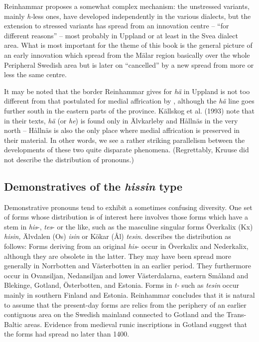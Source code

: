\begin{styleBodytextC}
 Reinhammar proposes a somewhat complex mechanism: the unstressed variants, mainly \textit{h-}less ones, have developed independently in the various dialects, but the extension to stressed variants has spread from an innovation centre – “for different reasons” –  most probably in Uppland or at least in the Svea dialect area. What is most important for the theme of this book is the general picture of an early innovation which spread from the Mälar region basically over the whole Peripheral Swedish area but is later on “cancelled” by a new spread from more or less the same centre. 

\end{styleBodytextC}

\begin{styleBodytextC}
It may be noted that the border Reinhammar gives for \textit{hä} in Uppland is not too different from that postulated for medial affrication by \citet{Kruuse1908}, although the \textit{hä} line goes further south in the eastern parts of the province. Källskog et al. (1993) note that in their texts, \textit{hä} (or \textit{he}) is found only in Älvkarleby and Hållnäs in the very north – Hållnäs is also the only place where medial affrication is preserved in their material. In other words, we see a rather striking parallelism between the developments of these two quite disparate phenomena. (Regrettably, Kruuse did not describe the distribution of pronouns.)

\end{styleBodytextC}

\subsection{Demonstratives of the \textit{hissin} type}

\begin{styleBodyTextFirst}
Demonstrative pronouns tend to exhibit a sometimes confusing diversity. One set of forms whose distribution is of interest here involves those forms which have a stem in \textit{his}{}-, \textit{tes}{}- or the like, such as the masculine singular forms Överkalix (Kx) \textit{hisin, }Älvdalen (Os) \textit{isin }or Kökar (Ål) \textit{tesin}. \citet{Reinhammar1988} describes the distribution as follows: Forms deriving from an original \textit{his}{}- occur in Överkalix and Nederkalix, although they are obsolete in the latter. They may have been spread more  generally in Norrbotten and Västerbotten in an earlier period. They furthermore occur in Ovansiljan, Nedansiljan and lower Västerdalarna, eastern Småland and Blekinge, Gotland, Österbotten, and Estonia. Forms in \textit{t-} such as \textit{tesin} occur mainly in southern Finland and Estonia. Reinhammar concludes that it is natural to assume that the present-day forms are relics from the periphery of an earlier contiguous area on the Swedish mainland connected to Gotland and the Trans-Baltic areas. Evidence from medieval runic inscriptions in Gotland suggest that the forms had spread no later than 1400.

\end{styleBodyTextFirst}

